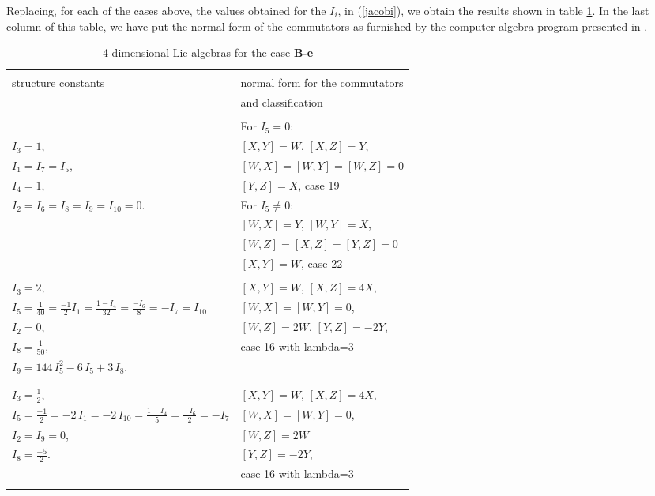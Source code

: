 Replacing, for each of the cases above, the values obtained for the $I_{i}$, 
in (\ref{jacobi}), we obtain the results shown in table \ref{tab_1}. In the 
last column of this table, we have put the normal form of the commutators as 
furnished by the computer algebra program presented in \cite{P_Schobel92}. 
\begin{table}[h]
\label{tab_1}
\caption{4-dimensional Lie algebras for the case {\bf B-e}}
\begin{tabular}{|l|l|}
\hline \hline 
& \\
structure constants & normal form for the commutators \\
& and classification \\
\hline
& \\
& For $I_{5}=0$: \\
$I_{3}=1$, & $[X,Y]=W$, $[X,Z]=Y$, \\
$I_{1}=I_{7}=I_{5}$, &  $[W,X]=[W,Y]=[W,Z]=0$ \\
$I_{4}=1$, & $[Y,Z]=X$,  case 19 \\
$I_{2}=I_{6}=I_{8}=I_{9}=I_{10}=0$. & For $I_{5} \neq 0$: \\
& $[W,X]=Y$, $[W,Y]=X$, \\ 
&$[W,Z]=[X,Z]=[Y,Z]=0$ \\
& $[X,Y]=W$,  case 22 \\                   
\hline                 
& \\
$I_{3}=2$, & $[X,Y]=W$, $[X,Z]=4X$, \\
$I_{5}=\frac{1}{40}=\frac{-1}{2}I_{1}=\frac{1-I_{4}}{32}
=\frac{-I_{6}}{8}=-I_{7}=I_{10}$ & $[W,X]=[W,Y]=0$, \\
$I_{2}=0$, &  $[W,Z]=2W$, $[Y,Z]=-2Y$, \\
$I_{8}=\frac{1}{50}$, & case 16 with lambda=3 \\
$I_{9}=144\,I_{5}^{2} - 6\,I_{5} + 3\,I_{8}$. &  \\
& \\
\hline        
& \\           
$I_{3}=\frac{1}{2}$, & $[X,Y]=W$, $[X,Z]=4X$, \\
$I_{5}=\frac{ - 1}{2}=-2\,I_{1}=-2\,I_{10}
=\frac{1-I_{4}}{5}=\frac{-I_{6}}{2}=-I_{7}$ & $[W,X]=[W,Y]=0$, \\
$I_{2}=I_{9}=0$, & $[W,Z]=2W$ \\
$I_{8}=\frac{ - 5}{2}$. & $[Y,Z]=-2Y$, \\
& case 16 with lambda=3 \\
& \\

\end{tabular}
\end{table}
